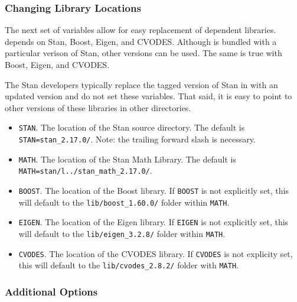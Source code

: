 \subsubsection{Changing Library Locations}

The next set of variables allow for easy replacement of dependent
libraries. \CmdStan depends on Stan, Boost, Eigen, and
CVODES. Although \CmdStan is bundled with a particular verison of
Stan, other versions can be used. The same is true with Boost, Eigen,
and CVODES.

The Stan developers typically replace the tagged version of Stan in
 with an updated version and do not set
these variables. That said, it is easy to point \CmdStan to other
versions of these libraries in other directories.
%
\begin{itemize}
  \item \Verb|STAN|. The location of the Stan source
    directory. The default is \Verb|STAN=stan_2.17.0/|. Note: the
    trailing forward slash is necessary.
  \item \Verb|MATH|. The location of the Stan Math Library. The
    default is \Verb|MATH=stan/l../stan_math_2.17.0/|.
  \item \Verb|BOOST|. The location of the Boost library. If
    \Verb|BOOST| is not explicitly set, this will default to the
    \Verb|lib/boost_1.60.0/| folder within \Verb|MATH|.
  \item \Verb|EIGEN|. The location of the Eigen library. If
    \Verb|EIGEN| is not explicitly set, this will default to the
    \Verb|lib/eigen_3.2.8/| folder within \Verb|MATH|.
  \item \Verb|CVODES|. The location of the CVODES library. If
    \Verb|CVODES| is not explicity set, this will default to the
    \Verb|lib/cvodes_2.8.2/| folder with \Verb|MATH|.
\end{itemize}
%

\subsubsection{Additional Options}

